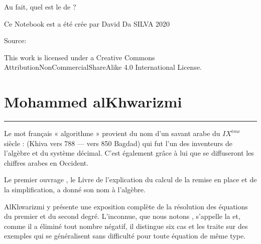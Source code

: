 \documentclass[letterpaper,10pt,english]{sphinxmanual}
\begin{document}
Au fait, quel est le  de  ?

\begin{sphinxVerbatim}[commandchars=\\\{\}]
 

  
  

\end{sphinxVerbatim}

Ce Notebook est a été crée par David Da SILVA \sphinxhyphen{} 2020

Source: 

This work is licensed under a Creative Commons Attribution\sphinxhyphen{}NonCommercial\sphinxhyphen{}ShareAlike 4.0 International License.



\chapter{Mohammed al\sphinxhyphen{}Khwarizmi}
\label{\detokenize{src/OCI_HS1_Algorithmes:mohammed-al-khwarizmi}}\label{\detokenize{src/OCI_HS1_Algorithmes::doc}}

\bigskip\hrule\bigskip


Le mot français « algorithme » provient du nom d’un savant arabe du \(IX^{ème}\) siècle :  (Khiva vers 788 — vers 850 Bagdad) qui fut l’un des inventeurs de l’algèbre et du système décimal.
C’est également grâce à lui que se diffuseront les chiffres arabes en Occident.

Le premier ouvrage , le Livre de l’explication du calcul de la remise en place et de la simplification, a donné son nom à l’algèbre.

Al\sphinxhyphen{}Khwarizmi y présente une exposition complète de la résolution des équations du premier et du second degré. L’inconnue, que nous notons , s’appelle la  et, comme il a éliminé tout nombre négatif, il distingue six cas et les traite sur des exemples qui se généralisent sans difficulté pour toute équation de même type.
\end{document}
